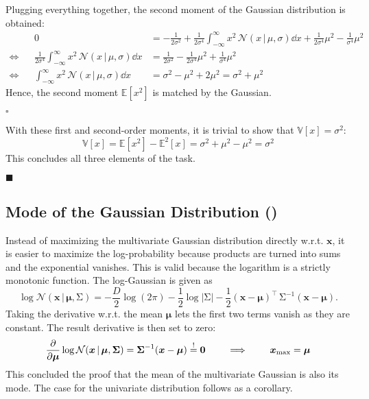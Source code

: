 \documentclass[11pt, a4paper]{scrartcl}
\newcommand{\E}{\mathbb{E}}
\newcommand{\Var}{\mathbb{V}}
\newcommand{\normal}{\mathcal{N}}
\newcommand{\transposed}{{\!\top\!}}
\renewcommand{\vec}[1]{\bm{#1}}
\newcommand{\mat}[1]{\bm{\mathrm{#1}}}
\newcommand{\given}{\,\vert\,}
\newcommand{\qed}{\hfill\(\square\)}
\newcommand{\eot}{\hfill\(\blacksquare\)}
\newcommand{\diffstar}{\texorpdfstring{\raisebox{-1pt}{\resizebox{!}{8pt}{\(\star\)}}}{*}}
\newcommand{\onestar}  {(\diffstar)}
\begin{document}
			Plugging everything together, the second moment of the Gaussian distribution is obtained:
			\begin{align}
				&&
				0 &= -\frac{1}{2 \sigma^2} + \frac{1}{2 \sigma^4} \int_{-\infty}^{\infty}\! x^2 \, \normal(x \given \mu, \sigma) \dd{x} + \frac{1}{2 \sigma^4} \mu^2 - \frac{1}{\sigma^4} \mu^2 & \\
				\iff &&
				\frac{1}{2 \sigma^4} \int_{-\infty}^{\infty}\! x^2 \, \normal(x \given \mu, \sigma) \dd{x} &= \frac{1}{2 \sigma^2} - \frac{1}{2 \sigma^4} \mu^2 + \frac{1}{\sigma^4} \mu^2 & \\
				\iff &&
				\int_{-\infty}^{\infty}\! x^2 \, \normal(x \given \mu, \sigma) \dd{x} &= \sigma^2 - \mu^2 + 2 \mu^2 = \sigma^2 + \mu^2 &
			\end{align}
			Hence, the second moment \( \E[x^2] \) is matched by the Gaussian.

			\qed

			With these first and second-order moments, it is trivial to show that \( \Var[x] = \sigma^2 \):
			\begin{equation}
				\Var[x] = \E[x^2] - \E^2[x] = \sigma^2 + \mu^2 - \mu^2 = \sigma^2
			\end{equation}
			This concludes all three elements of the task.

			\eot

		\subsection{Mode of the Gaussian Distribution  \onestar}
			Instead of maximizing the multivariate Gaussian distribution directly w.r.t. \(\vec{x}\), it is easier to maximize the log-probability because products are turned into sums and the exponential vanishes. This is valid because the logarithm is a strictly monotonic function. The log-Gaussian is given as
			\begin{equation}
				\log \normal(\vec{x} \given \vec{\mu}, \mat{\Sigma})
					= -\frac{D}{2} \log(2\pi) - \frac{1}{2} \log \lvert \mat{\Sigma} \rvert - \frac{1}{2} (\vec{x} - \vec{\mu})^\transposed \, \mat{\Sigma}^{-1} (\vec{x} - \vec{\mu}).
			\end{equation}
			Taking the derivative w.r.t. the mean \(\vec{\mu}\) lets the first two terms vanish as they are constant. The result derivative is then set to zero:
			\begin{equation}
				\pdv{\vec{\mu}} \log \normal(\vec{x} \given \vec{\mu}, \mat{\Sigma}) = \mat{\Sigma}^{-1} (\vec{x} - \vec{\mu}) \overset{!}{=} \vec{0}
				\qquad\implies\qquad
				\vec{x}_\mathrm{max} = \vec{\mu}
			\end{equation}
			This concluded the proof that the mean of the multivariate Gaussian is also its mode. The case for the univariate distribution follows as a corollary.
\end{document}
